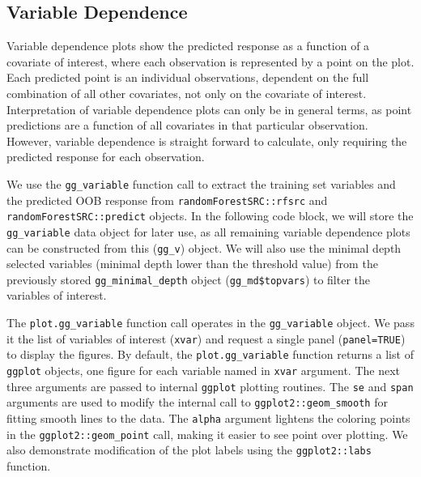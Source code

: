 \documentclass[article]{jss}
\begin{document}
\hypertarget{variable-dependence}{%
\subsection{Variable Dependence}\label{variable-dependence}}

Variable dependence plots show the predicted response as a function of a
covariate of interest, where each observation is represented by a point
on the plot. Each predicted point is an individual observations,
dependent on the full combination of all other covariates, not only on
the covariate of interest. Interpretation of variable dependence plots
can only be in general terms, as point predictions are a function of all
covariates in that particular observation. However, variable dependence
is straight forward to calculate, only requiring the predicted response
for each observation.

We use the \texttt{gg\_variable} function call to extract the training
set variables and the predicted OOB response from
\texttt{randomForestSRC::rfsrc} and \texttt{randomForestSRC::predict}
objects. In the following code block, we will store the
\texttt{gg\_variable} data object for later use, as all remaining
variable dependence plots can be constructed from this (\texttt{gg\_v})
object. We will also use the minimal depth selected variables (minimal
depth lower than the threshold value) from the previously stored
\texttt{gg\_minimal\_depth} object (\texttt{gg\_md\$topvars}) to filter
the variables of interest.

The \texttt{plot.gg\_variable} function call operates in the
\texttt{gg\_variable} object. We pass it the list of variables of
interest (\texttt{xvar}) and request a single panel
(\texttt{panel=TRUE}) to display the figures. By default, the
\texttt{plot.gg\_variable} function returns a list of \texttt{ggplot}
objects, one figure for each variable named in \texttt{xvar} argument.
The next three arguments are passed to internal \texttt{ggplot} plotting
routines. The \texttt{se} and \texttt{span} arguments are used to modify
the internal call to \texttt{ggplot2::geom\_smooth} for fitting smooth
lines to the data. The \texttt{alpha} argument lightens the coloring
points in the \texttt{ggplot2::geom\_point} call, making it easier to
see point over plotting. We also demonstrate modification of the plot
labels using the \texttt{ggplot2::labs} function.
\end{document}
